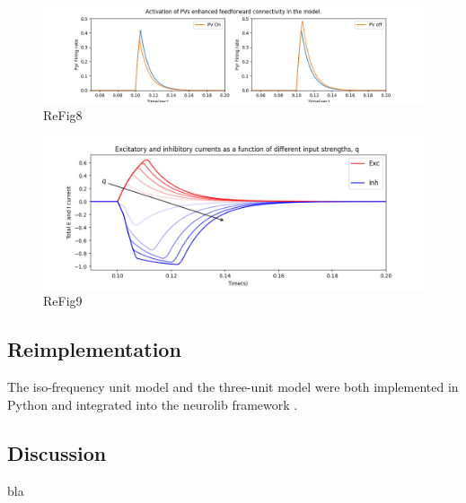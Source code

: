 \begin{figure}
 \includegraphics[width=\textwidth]{Figures/Fig8BD}
 \caption{ReFig8}
\end{figure}

\begin{figure}
 \includegraphics[width=\textwidth]{Figures/Fig9}
 \caption{ReFig9}
\end{figure}


\subsection{Reimplementation}
The iso-frequency unit model and the three-unit model were both implemented in Python and integrated into the neurolib framework 
\supercite{cakan2019neurolib}.


 




\subsection{Discussion}
bla

